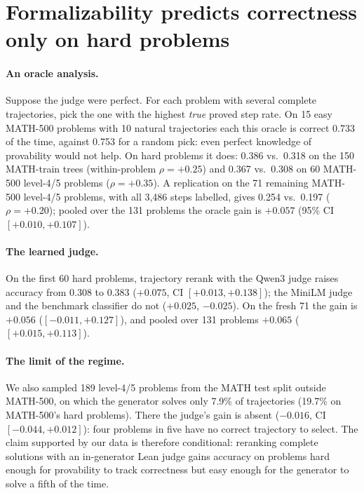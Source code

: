 \documentclass[10pt]{article}
\begin{document}
\section{Formalizability predicts correctness only on hard problems}\label{sec:coupling}

\paragraph{An oracle analysis.} Suppose the judge were perfect. For each problem with several complete trajectories, pick the one with the highest \emph{true} proved step rate. On 15 easy MATH-500 problems with 10 natural trajectories each this oracle is correct 0.733 of the time, against 0.753 for a random pick: even perfect knowledge of provability would not help. On hard problems it does: 0.386 vs.\ 0.318 on the 150 MATH-train trees (within-problem $\rho=+0.25$) and 0.367 vs.\ 0.308 on 60 MATH-500 level-4/5 problems ($\rho=+0.35$). A replication on the 71 remaining MATH-500 level-4/5 problems, with all 3{,}486 steps labelled, gives 0.254 vs.\ 0.197 ($\rho=+0.20$); pooled over the 131 problems the oracle gain is $+0.057$ (95\% CI $[+0.010,+0.107]$).

\paragraph{The learned judge.} On the first 60 hard problems, trajectory rerank with the Qwen3 judge raises accuracy from 0.308 to 0.383 ($+0.075$, CI $[+0.013,+0.138]$); the MiniLM judge and the benchmark classifier do not ($+0.025$, $-0.025$). On the fresh 71 the gain is $+0.056$ ($[-0.011,+0.127]$), and pooled over 131 problems $+0.065$ ($[+0.015,+0.113]$).

\paragraph{The limit of the regime.} We also sampled 189 level-4/5 problems from the MATH test split outside MATH-500, on which the generator solves only 7.9\% of trajectories (19.7\% on MATH-500's hard problems). There the judge's gain is absent ($-0.016$, CI $[-0.044,+0.012]$): four problems in five have no correct trajectory to select. The claim supported by our data is therefore conditional: reranking complete solutions with an in-generator Lean judge gains accuracy on problems hard enough for provability to track correctness but easy enough for the generator to solve a fifth of the time.
\end{document}
